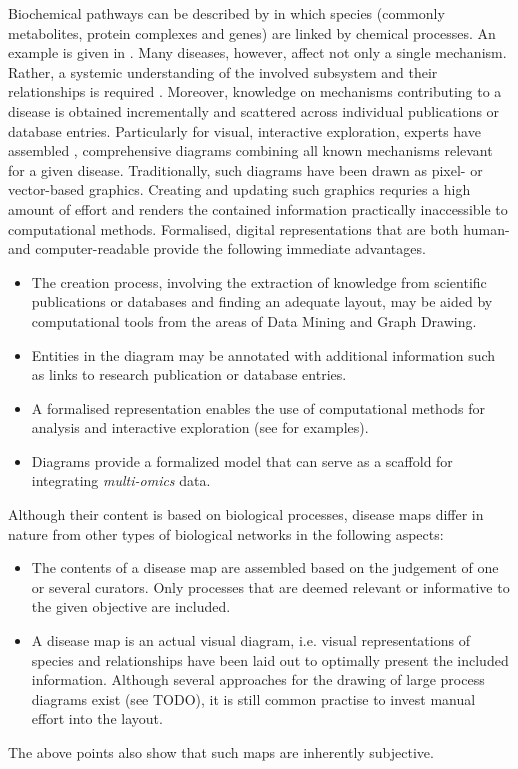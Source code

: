 \documentclass[
	fontsize=10pt, %
	twoside=false, %
	secnumdepth=1, %
]{kaobook}
\begin{document}
Biochemical pathways can be described by  in
which species (commonly metabolites, protein complexes and genes) are linked by
chemical processes. An example is given in .
%
Many diseases, however, affect not only a single mechanism. Rather, a systemic
understanding of the involved subsystem and their relationships is required
\cite{ostaszewski_CommunitydrivenRoadmapIntegrated_2019}\cite{mazein_SystemsMedicineDisease_2018}.
%
Moreover, knowledge on mechanisms contributing to a disease is obtained
incrementally and scattered across individual publications or database entries.
%
Particularly for visual, interactive exploration, experts have assembled
, comprehensive diagrams combining all known mechanisms
relevant for a given disease.
%
Traditionally, such diagrams have been drawn as pixel- or vector-based graphics.
Creating and updating such graphics requries a high amount of effort and renders
the contained information practically inaccessible to computational methods.
%
Formalised, digital representations that are both human- and computer-readable
provide the following immediate advantages. 
\begin{itemize}
\item The creation process, involving the extraction of knowledge from
  scientific publications or databases and finding an adequate layout, may be
  aided by computational tools from the areas of Data Mining and Graph Drawing.
  \item Entities in the diagram may be annotated with additional information
    such as links to research publication or database entries.
\item A formalised representation enables the use of computational methods for
  analysis and interactive exploration (see  for examples).
\item Diagrams provide a formalized model that can serve as a scaffold for
  integrating \textit{multi-omics} data. %
\end{itemize}

Although their content is based on biological processes, disease maps differ in
nature from other types of biological networks in the following aspects:
\begin{itemize}
\item The contents of a disease map are assembled based on the judgement of one
  or several curators. Only processes that are deemed relevant or informative to
  the given objective are included.
\item A disease map is an actual visual diagram, i.e. visual representations of
  species and relationships have been laid out to optimally present the included
  information. Although several approaches for the drawing of large process
  diagrams exist (see TODO), it is still common practise
  to invest manual effort into the layout.
\end{itemize}
The above points also show that such maps are inherently subjective.
\end{document}
